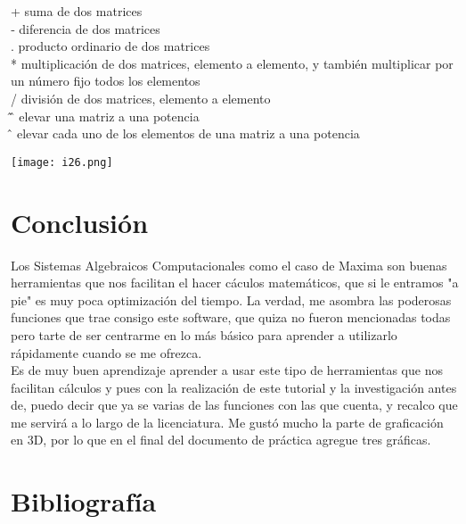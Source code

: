 \documentclass[12pt]{article}
\begin{document}
 + suma de dos matrices\\

 ‐ diferencia de dos matrices\\

 . producto ordinario de dos matrices\\

 * multiplicación de dos matrices, elemento a elemento, y también multiplicar por un número fijo todos los elementos\\

 / división de dos matrices, elemento a elemento\\

 \^\,\^\, elevar una matriz a una potencia\\

 \^\, elevar cada uno de los elementos de una matriz a una potencia
 
 \begin{center}
   \texttt{[image: i26.png]}\\
\end{center}

\section*{Conclusión}
Los Sistemas Algebraicos Computacionales como el caso de Maxima son buenas herramientas que nos facilitan el hacer cáculos matemáticos, que si le entramos "a pie" es muy poca optimización del tiempo. La verdad, me asombra las poderosas funciones que trae consigo este software, que quiza no fueron mencionadas todas pero tarte de ser centrarme en lo más básico para aprender a utilizarlo rápidamente cuando se me ofrezca.\\

Es de muy buen aprendizaje aprender a usar este tipo de herramientas que nos facilitan cálculos y pues con la realización de este tutorial y la investigación antes de, puedo decir que ya se varias de las funciones con las que cuenta, y recalco que me servirá a lo largo de la licenciatura. Me gustó mucho la parte de graficación en 3D, por lo que en el final del documento de práctica agregue tres gráficas.

\newpage
\section*{Bibliografía}
\end{document}
